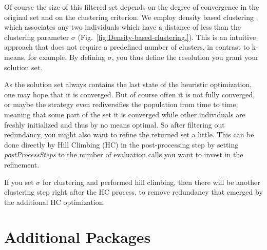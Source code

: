 Of course the size of this filtered set depends on the degree of convergence
in the original set and on the clustering criterion. We employ density
based clustering \cite{ester96density}, which associates any two
individuals which have a distance of less than the clustering parameter
$\sigma$ (Fig.~\ref{fig:Density-based-clustering.}). This is an
intuitive approach that does not require a predefined number of clusters,
in contrast to k-means, for example. By defining $\sigma$, you thus
define the resolution you grant your solution set.

As the solution set always contains the last state of the heuristic
optimization, one may hope that it is converged. But of course often
it is not fully converged, or maybe the strategy even rediversifies
the population from time to time, meaning that some part of the set
it is converged while other individuals are freshly initialized and
thus by no means optimal. So after filtering out redundancy, you might
also want to refine the returned set a little. This can be done directly
by Hill Climbing (HC) in the post-processing step by setting \emph{postProcessSteps}
to the number of evaluation calls you want to invest in the refinement.%

If you set $\sigma$ for clustering and performed hill climbing, then
there will be another clustering step right after the HC process,
to remove redundancy that emerged by the additional HC optimization.


\section{Additional Packages}

